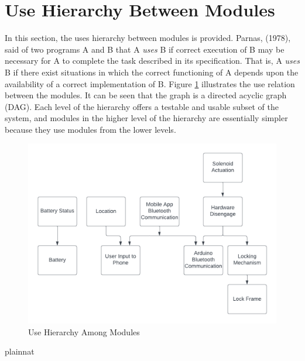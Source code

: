 \documentclass[12pt, titlepage]{article}
\begin{document}
\section{Use Hierarchy Between Modules} \label{SecUse}

In this section, the uses hierarchy between modules is
provided. Parnas, (1978), said of two programs A and B that A {\em uses} B if
correct execution of B may be necessary for A to complete the task described in
its specification. That is, A {\em uses} B if there exist situations in which
the correct functioning of A depends upon the availability of a correct
implementation of B.  Figure \ref{FigUH} illustrates the use relation between
the modules. It can be seen that the graph is a directed acyclic graph
(DAG). Each level of the hierarchy offers a testable and usable subset of the
system, and modules in the higher level of the hierarchy are essentially simpler
because they use modules from the lower levels.

\begin{figure}[H]
\centering
\includegraphics[width=1\textwidth]{DAG.png}
\caption{Use Hierarchy Among Modules}
\label{FigUH}
\end{figure}


 {plainnat}


\newpage{}
\end{document}
